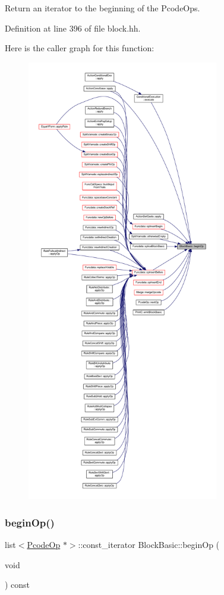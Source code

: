Return an iterator to the beginning of the Pcode\+Ops. 



Definition at line 396 of file block.\+hh.

Here is the caller graph for this function\+:
\nopagebreak
\begin{figure}[H]
\begin{center}
\leavevmode
\includegraphics[height=550pt]{class_block_basic_a3ddd779a5af8cb12e6fc069bd49ddb6c_icgraph}
\end{center}
\end{figure}
\mbox{\label{class_block_basic_a79b0dca4faff5ba6eb69c1477c9251eb}} 
\subsubsection{\texorpdfstring{beginOp()}{beginOp()}\hspace{0.1cm}{\footnotesize\ttfamily [2/2]}}
{\footnotesize\ttfamily list$<$\mbox{\hyperlink{class_pcode_op}{Pcode\+Op}} $\ast$$>$\+::const\+\_\+iterator Block\+Basic\+::begin\+Op (\begin{DoxyParamCaption}\item[{void}]{ }\end{DoxyParamCaption}) const\hspace{0.3cm}{\ttfamily [inline]}}



